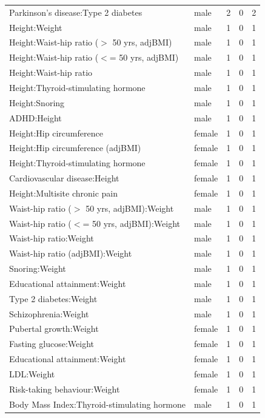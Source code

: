\begin{table}[ht]
\begin{tabular}{llrrr}
  Parkinson's disease:Type 2 diabetes & male &   2 &   0 &   2 \\ 
  Height:Weight & male &   1 &   0 &   1 \\ 
  Height:Waist-hip ratio ($>$ 50 yrs, adjBMI) & male &   1 &   0 &   1 \\ 
  Height:Waist-hip ratio ($<$= 50 yrs, adjBMI) & male &   1 &   0 &   1 \\ 
  Height:Waist-hip ratio & male &   1 &   0 &   1 \\ 
  Height:Thyroid-stimulating hormone & male &   1 &   0 &   1 \\ 
  Height:Snoring & male &   1 &   0 &   1 \\ 
  ADHD:Height & male &   1 &   0 &   1 \\ 
  Height:Hip circumference & female &   1 &   0 &   1 \\ 
  Height:Hip circumference (adjBMI) & female &   1 &   0 &   1 \\ 
  Height:Thyroid-stimulating hormone & female &   1 &   0 &   1 \\ 
  Cardiovascular disease:Height & female &   1 &   0 &   1 \\ 
  Height:Multisite chronic pain & female &   1 &   0 &   1 \\ 
  Waist-hip ratio ($>$ 50 yrs, adjBMI):Weight & male &   1 &   0 &   1 \\ 
  Waist-hip ratio ($<$= 50 yrs, adjBMI):Weight & male &   1 &   0 &   1 \\ 
  Waist-hip ratio:Weight & male &   1 &   0 &   1 \\ 
  Waist-hip ratio (adjBMI):Weight & male &   1 &   0 &   1 \\ 
  Snoring:Weight & male &   1 &   0 &   1 \\ 
  Educational attainment:Weight & male &   1 &   0 &   1 \\ 
  Type 2 diabetes:Weight & male &   1 &   0 &   1 \\ 
  Schizophrenia:Weight & male &   1 &   0 &   1 \\ 
  Pubertal growth:Weight & female &   1 &   0 &   1 \\ 
  Fasting glucose:Weight & female &   1 &   0 &   1 \\ 
  Educational attainment:Weight & female &   1 &   0 &   1 \\ 
  LDL:Weight & female &   1 &   0 &   1 \\ 
  Risk-taking behaviour:Weight & female &   1 &   0 &   1 \\ 
  Body Mass Index:Thyroid-stimulating hormone & male &   1 &   0 &   1 \\ 

\end{tabular}
\end{table}
